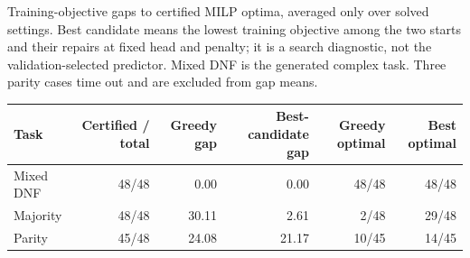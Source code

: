 \begin{kbtable}
\centering
\caption{Training-objective gaps to certified MILP optima, averaged only over solved settings. Best candidate means the lowest training objective among the two starts and their repairs at fixed head and penalty; it is a search diagnostic, not the validation-selected predictor. Mixed DNF is the generated complex task. Three parity cases time out and are excluded from gap means.}
\label{tab:search}
\small
\begin{adjustbox}{max width=\linewidth}
\begin{tabular}{lrrrrr}
\toprule
Task & Certified / total & Greedy gap & Best-candidate gap & Greedy optimal & Best optimal \\
\midrule
Mixed DNF & 48/48 & 0.00 & 0.00 & 48/48 & 48/48 \\
Majority & 48/48 & 30.11 & 2.61 & 2/48 & 29/48 \\
Parity & 45/48 & 24.08 & 21.17 & 10/45 & 14/45 \\
\bottomrule
\end{tabular}
\end{adjustbox}
\end{kbtable}

